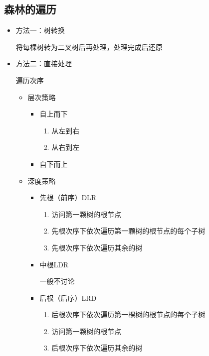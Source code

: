 \documentclass[AutoFakeBold]{LZUThesis2007}
\begin{document}
		\subsection{森林的遍历}
		\begin{itemize}
			\item 方法一：树转换

			将每棵树转为二叉树后再处理，处理完成后还原
			\item 方法二：直接处理

					遍历次序
						\begin{itemize}
							\item 层次策略
								\begin{itemize}
									\item 自上而下
										\begin{enumerate}
											\item 从左到右
											\item 从右到左
										\end{enumerate}
									\item 自下而上
								\end{itemize}
							\item 深度策略
								\begin{itemize}
									\item 先根（前序）DLR
										\begin{enumerate}
											\item 访问第一颗树的根节点
											\item 先根次序下依次遍历第一颗树的根节点的每个子树
											\item 先根次序下依次遍历其余的树
										\end{enumerate}
									\item 中根LDR
										
									一般不讨论
									\item 后根（后序）LRD
										\begin{enumerate}
											\item 后根次序下依次遍历第一棵树的根节点的每个子树
											\item 访问第一颗树的根节点
											\item 后根次序下依次遍历其余的树
										\end{enumerate}
								\end{itemize}
						\end{itemize}
		\end{itemize}
\end{document}
